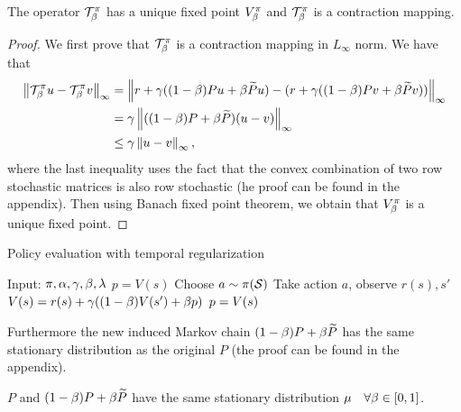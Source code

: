 \begin{theorem}
The operator $\mathcal{T}^{\pi}_{\beta}$ has a unique fixed point $V_{\beta}^{\pi}$ and $\mathcal{T}^{\pi}_{\beta}$ is a contraction mapping.
\end{theorem}
\begin{proof}
We first prove that $\mathcal{T}^{\pi}_{\beta}$ is a contraction mapping in $L_\infty$ norm. We have that
\begin{equation}
\begin{split}
    \left\lVert\mathcal{T}^{\pi}_{\beta} u - \mathcal{T}^{\pi}_{\beta} v\right\rVert_{\infty} &= \left\lVert r+\gamma( (1-\beta) Pu + \beta \widetilde{P}u) - (r+\gamma( (1-\beta) Pv + \beta \widetilde{P}v))\right\rVert_{\infty}\\
    &= \gamma \left\lVert((1-\beta) P + \beta \widetilde{P})(u-v)\right\rVert_{\infty}\\
    &\leq \gamma \left\lVert u-v\right\rVert_{\infty},
\end{split}
\end{equation}
where the last inequality uses the fact that the convex combination of two row stochastic matrices is also row stochastic (he proof can be found in the appendix).
Then using Banach fixed point theorem, we obtain that $V_{\beta}^{\pi}$ is a unique fixed point. 
\end{proof}
\begin{algorithm}[H]
\caption{Policy evaluation with temporal regularization}
\begin{algorithmic}[1]
    \STATE Input: $\pi,\alpha,\gamma,\beta,\lambda$
    \STATE $p = V(s)$
        \STATE Choose $a \sim \pi(\mathcal{S})$
        \STATE Take action $a$, observe $r(s),s'$
        \STATE $V(s) = r(s) + \gamma ( (1-\beta) V(s') + \beta p) $
        \STATE $p = V(s) $
    \ENDFOR
\end{algorithmic}
\label{alg:pol_eval_exp_smoothing}
\end{algorithm}

Furthermore the new induced Markov chain $(1-\beta) P + \beta \widetilde{P}$ has the same stationary distribution as the original $P$ (the proof can be found in the appendix).
\begin{lemma}
\label{cor:same_stationary_dist}
$P$ and $(1-\beta) P + \beta \widetilde{P}$ have the same stationary distribution $\mu \quad \forall \beta \in [0,1]$.
\end{lemma}


